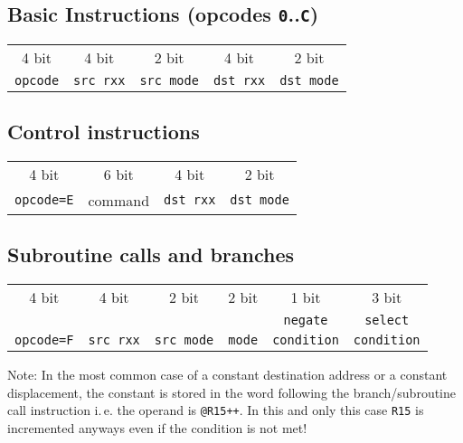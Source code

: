 \documentclass{leaflet}
\begin{document}
%
\vspace*{-13mm}
  \subsection{Basic Instructions (opcodes \texttt{0}..\texttt{C})}
   \begin{center}
{\scriptsize
    \begin{longtable}{|c||c|c||c|c|}
     \hline
     4 bit&4 bit&2 bit&4 bit&2 bit\\
     {\tt opcode}&{\tt src rxx}&{\tt src mode}&
     {\tt dst rxx}&{\tt dst mode}\\
     \hline
    \end{longtable}
}
   \end{center}
  \vspace*{-14mm}
%
  \subsection{Control instructions}
    \begin{center}
{\scriptsize
     \begin{longtable}{|c||c||c|c|}
      \hline
      4 bit&6 bit&4 bit&2 bit\\
      {\tt opcode=E}&command&\texttt{dst rxx}&\texttt{dst mode}\\
      \hline
     \end{longtable}
}
    \end{center}
   \vspace*{-13mm}
%
  \subsection{Subroutine calls and branches}
   {\scriptsize
    \begin{center}
{\scriptsize
     \begin{longtable}{|c||c|c||c||c|c|}
      \hline
      4 bit&4 bit&2 bit&2 bit&1 bit&3 bit\\
      &     &     &     &{\tt negate}&{\tt select}\\
      {\tt opcode=F}&{\tt src rxx}&{\tt src mode}&
      {\tt mode}&{\tt condition}&{\tt condition}\\
      \hline
     \end{longtable}
}
    \end{center}
   }
   \vspace*{-10mm}
   Note: In the most common case of a constant destination address or a 
   constant displacement, the constant is stored in the word following the 
   branch/subroutine call instruction i.\,e. the operand is \texttt{@R15++}.
   In this and only this case \texttt{R15} is incremented anyways even if
   the condition is not met!
%
\end{document}
